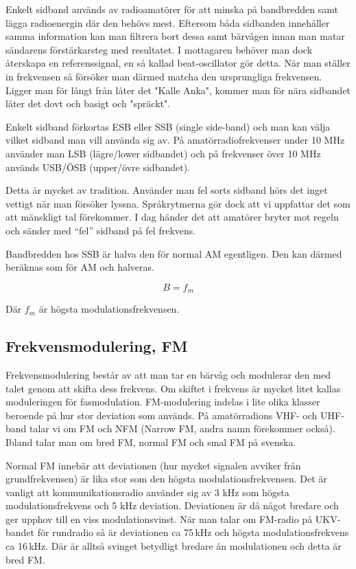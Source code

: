 Enkelt sidband används av radioamatörer för att minska på bandbredden samt
lägga radioenergin där den behövs mest. Eftersom båda sidbanden innehåller
samma information kan man filtrera bort dessa samt bärvågen innan man matar
sändarens förstärkarsteg med resultatet. I mottagaren behöver man dock
återskapa en referenssignal, en så kallad beat-oscillator gör detta. När man
ställer in frekvensen så försöker man därmed matcha den ursprungliga
frekvensen. Ligger man för långt från låter det "Kalle Anka", kommer man för
nära sidbandet låter det dovt och basigt och "spräckt".

Enkelt sidband förkortas ESB eller SSB (single side-band) och man kan välja
vilket sidband man vill använda sig av. På amatörradiofrekvenser under 10 MHz
använder man LSB (lägre/lower sidbandet) och på frekvenser över 10 MHz används
USB/ÖSB (upper/övre sidbandet).

Detta är mycket av tradition. Använder man fel sorts sidband hörs det inget
vettigt när man försöker lyssna. Språkrytmerna gör dock att vi uppfattar det
som att mänskligt tal förekommer. I dag händer det att amatörer bryter mot
regeln och sänder med ``fel'' sidband på fel frekvens.

Bandbredden hos SSB är halva den för normal AM egentligen. Den kan därmed
beräknas som för AM och halveras.

\begin{equation}
	B=f_m
\end{equation}

Där $f_m$ är högsta modulationsfrekvensen.

\subsection{Frekvensmodulering, FM}

Frekvensmodulering består av att man tar en bärvåg och modulerar den med talet
genom att skifta dess frekvens. Om skiftet i frekvens är mycket litet kallas
moduleringen för fasmodulation. FM-modulering indelas i lite olika klasser
beroende på hur stor deviation som används. På amatörradions VHF- och UHF-band
talar vi om FM och NFM (Narrow FM, andra namn förekommer också). Ibland talar
man om bred FM, normal FM och smal FM på svenska.

Normal FM innebär att deviationen (hur mycket signalen avviker från
grundfrekvensen) är lika stor som den högsta modulationsfrekvensen. Det är
vanligt att kommunikationsradio använder sig av 3 kHz som högsta
modulationsfrekvens och 5 kHz deviation. Deviationen är då något bredare och ger
upphov till en viss modulationsvinst. När man talar om FM-radio på UKV-bandet
för rundradio så är deviationen ca 75\,kHz och högsta modulationsfrekvens ca
16\,kHz. Där är alltså svinget betydligt bredare än modulationen och detta är
bred FM.

